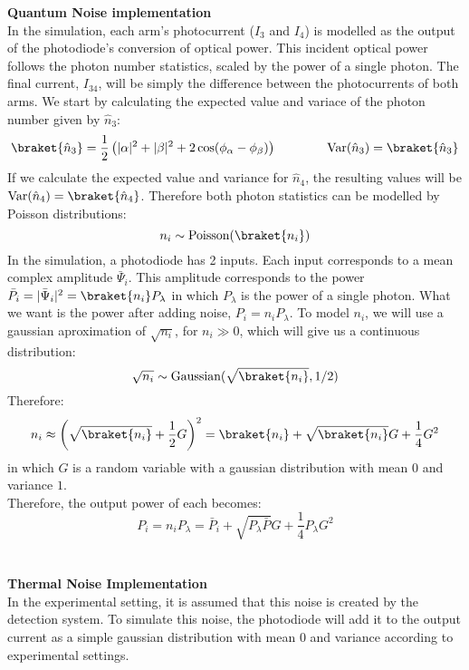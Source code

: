 
{\bf Quantum Noise implementation}\\
In the simulation, each arm's photocurrent ($I_3$ and $I_4$) is modelled as the output of the photodiode's conversion of optical power. This incident optical power follows the photon number statistics, scaled by the power of a single photon. The final current, $I_{34}$, will be simply the difference between the photocurrents of both arms.
We start by calculating the expected value and variace of the photon number given by $\hat{n}_3$:
%
\begin{equation}
\braket{\hat{n}_3} = \frac{1}{2} \left( |\alpha|^2 + |\beta|^2 + 2 \cos(\phi_\alpha - \phi_\beta) \right)
\qquad
\qquad
\textrm{Var}(\hat{n}_3) = \braket{\hat{n}_3}
\end{equation}
%
If we calculate the expected value and variance for $\hat{n}_4$, the resulting values will be $\textrm{Var}(\hat{n}_4) = \braket{\hat{n}_4}$. Therefore both photon statistics can be modelled by Poisson distributions:
%
\begin{equation}
n_i \sim \textrm{Poisson}(\braket{n_i})
\end{equation}
%
In the simulation, a photodiode has 2 inputs. Each input corresponds to a mean complex amplitude $\bar{\Psi}_i$. This amplitude corresponds to the power $\bar{P}_i = |\bar{\Psi}_i|^2 = \braket{n_i}P_\lambda$ in which $P_\lambda$ is the power of a single photon. What we want is the power after adding noise, $P_i = n_i P_\lambda$. To model $n_i$, we will use a gaussian aproximation of $\sqrt{n_i}$, for $n_i \gg 0$, which will give us a continuous distribution:
%
\begin{equation}
\sqrt{n_i} \sim \textrm{Gaussian}(\sqrt{\braket{n_i}}, 1/2)
\end{equation}
%
Therefore:
%
\begin{equation}
n_i \approx \left( \sqrt{\braket{n_i}} + \frac{1}{2}G \right)^2 = \braket{n_i} + \sqrt{\braket{n_i}} G + \frac{1}{4} G^2
\end{equation}
%
in which $G$ is a random variable with a gaussian distribution with mean $0$ and variance $1$.\\
Therefore, the output power of each becomes:
%
\begin{equation}
P_i = n_i P_\lambda = \bar{P}_i + \sqrt{P_\lambda \bar{P}} G + \frac{1}{4} P_\lambda G^2
\end{equation}
%
\\
\\
{\bf Thermal Noise Implementation}\\
In the experimental setting, it is assumed that this noise is created by the detection system. To simulate this noise, the photodiode will add it to the output current as a simple gaussian distribution with mean $0$ and variance according to experimental settings.\\
